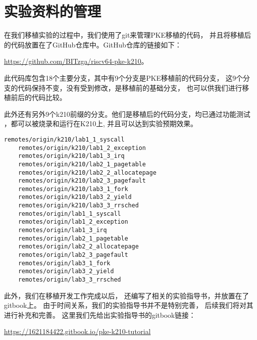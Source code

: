 \section{实验资料的管理}

在我们移植实验的过程中，我们使用了git来管理PKE移植的代码，
并且将移植后的代码放置在了GitHub仓库中。GitHub仓库的链接如下：

\href{https://github.com/BITzga/riscv64-pke-k210}{https://github.com/BITzga/riscv64-pke-k210}。

此代码库包含18个主要分支，其中有9个分支是PKE移植前的代码分支，
这9个分支的代码保持不变，没有受到修改，是移植前的基础分支，
也可以供我们进行移植前后的代码比较。

此外还有另外9个k210前缀的分支。他们是移植后的代码分支，均已通过功能测试
，都可以被烧录和运行在K210上, 并且可以达到实验预期效果。

\begin{lstlisting}[caption={分支列表}, label={lst:branch_list_1}]
    remotes/origin/k210/lab1_1_syscall
    remotes/origin/k210/lab1_2_exception
    remotes/origin/k210/lab1_3_irq
    remotes/origin/k210/lab2_1_pagetable
    remotes/origin/k210/lab2_2_allocatepage
    remotes/origin/k210/lab2_3_pagefault
    remotes/origin/k210/lab3_1_fork
    remotes/origin/k210/lab3_2_yield
    remotes/origin/k210/lab3_3_rrsched
    remotes/origin/lab1_1_syscall
    remotes/origin/lab1_2_exception
    remotes/origin/lab1_3_irq
    remotes/origin/lab2_1_pagetable
    remotes/origin/lab2_2_allocatepage
    remotes/origin/lab2_3_pagefault
    remotes/origin/lab3_1_fork
    remotes/origin/lab3_2_yield
    remotes/origin/lab3_3_rrsched
\end{lstlisting}

此外，我们在移植开发工作完成以后，
还编写了相关的实验指导书，并放置在了gitbook上。
由于时间关系，我们的实验指导书并不是特别完善，
后续我们将对其进行补充和完善。
这里我们先给出实验指导书的gitbook链接：

\href{https://1621184422.gitbook.io/pke-k210-tutorial}{https://1621184422.gitbook.io/pke-k210-tutorial}